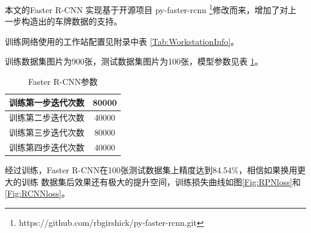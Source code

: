 本文的Faster R-CNN 实现基于开源项目 py-faster-rcnn
\footnote{https://github.com/rbgirshick/py-faster-rcnn.git}修改而来，增加了对上
一步构造出的车牌数据的支持。

训练网络使用的工作站配置见附录中表 \ref{Tab:WorkstationInfo}。

训练数据集图片为900张，测试数据集图片为100张，模型参数见表 \ref{Tab:FasterRCNNArgs}。

\begin{table}[ht]
\centering
\caption{Faster R-CNN参数}\label{Tab:FasterRCNNArgs}
\begin{tabular}{|c|c|}
\hline
训练第一步迭代次数 & 80000 \\
\hline
训练第二步迭代次数 & 40000 \\
\hline 
训练第三步迭代次数 & 80000 \\
\hline 
训练第四步迭代次数 & 40000 \\
\hline
\end{tabular}
\end{table}

经过训练，Faster R-CNN在100张测试数据集上精度达到84.54\%，相信如果换用更大的训练
数据集后效果还有极大的提升空间，训练损失曲线如图\ref{Fig:RPNloss}和\ref{Fig:RCNNloss}。


